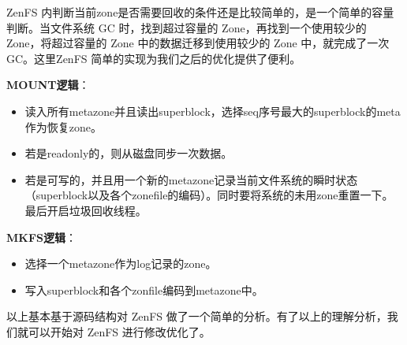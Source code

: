 ZenFS 内判断当前zone是否需要回收的条件还是比较简单的，是一个简单的容量判断。当文件系统 GC 时，找到超过容量的 Zone，再找到一个使用较少的 Zone，将超过容量的 Zone 中的数据迁移到使用较少的 Zone 中，就完成了一次 GC。这里ZenFS 简单的实现为我们之后的优化提供了便利。

\textbf{MOUNT逻辑}：

\begin{itemize}
  \item 读入所有metazone并且读出superblock，选择seq序号最大的superblock的meta作为恢复zone。
  \item 若是readonly的，则从磁盘同步一次数据。
  \item 若是可写的，并且用一个新的metazone记录当前文件系统的瞬时状态（superblock以及各个zonefile的编码）。同时要将系统的未用zone重置一下。最后开启垃圾回收线程。
\end{itemize}

\textbf{MKFS逻辑}：

\begin{itemize}
  \item 选择一个metazone作为log记录的zone。
  \item 写入superblock和各个zonfile编码到metazone中。
\end{itemize}

以上基本基于源码结构对 ZenFS 做了一个简单的分析。有了以上的理解分析，我们就可以开始对 ZenFS 进行修改优化了。